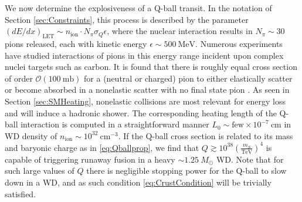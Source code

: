 \documentclass[twocolumn,showpacs,preprintnumbers,amsmath,amssymb,prd]{revtex4}
\newcommand{\OO}{\mathcal{O}}
\def\r{\right)}
\def\l{\left(}
\begin{document}
We now determine the explosiveness of a Q-ball transit.
In the notation of Section \ref{sec:Constraints}, this process is described by the parameter $(dE/dx)_\text{LET} \sim n_\text{ion} \cdot N_\pi \sigma_Q \epsilon$, where the nuclear interaction results in $N_\pi \sim 30$ pions released, each with kinetic energy $\epsilon \sim 500 ~\text{MeV}$.
Numerous experiments have studied interactions of pions in this energy range incident upon complex nuclei targets such as carbon.
It is found that there is roughly equal cross section of order $\OO (100 ~\text{mb})$ for a (neutral or charged) pion to either elastically scatter or become absorbed in a nonelastic scatter with no final state pion \cite{Pionnuclear}.
As seen in Section \ref{sec:SMHeating}, nonelastic collisions are most relevant for energy loss and will induce a hadronic shower.
The corresponding heating length of the Q-ball interaction is computed in a straightforward manner $L_0 \sim \text{few} \times 10^{-7} ~\text{cm}$ in WD density of $n_\text{ion} \sim 10^{32} ~\text{cm}^{-3}$.
If the Q-ball cross section is related to its mass and baryonic charge as in \eqref{eq:Qballprop}, we find that $Q \gtrsim 10^{38} \l\frac{m_S}{\text{TeV}}\r^4$ is capable of triggering runaway fusion in a heavy $\sim 1.25 ~M_{\odot}$ WD.
Note that for such large values of $Q$ there is negligible stopping power for the Q-ball to slow down in a WD, and as such condition \eqref{eq:CrustCondition} will be trivially satisfied.
\end{document}
